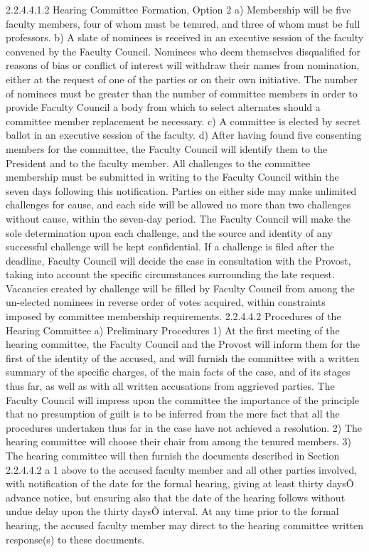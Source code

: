 \documentclass[letterpaper, 11pt]{article}
\begin{document}
				2.2.4.4.1.2 Hearing Committee Formation, Option 2
				a) Membership will be five faculty members, four of whom must be tenured, and three of whom must be full professors.
				b) A slate of nominees is received in an executive session of the faculty convened by the Faculty Council.  Nominees who deem themselves disqualified for reasons of bias or conflict of interest will withdraw their names from nomination, either at the request of one of the parties or on their own initiative.  The number of nominees must be greater than the number of committee members in order to provide Faculty Council a body from which to select alternates should a committee member replacement be necessary.
				c) A committee is elected by secret ballot in an executive session of the faculty.
				d) After having found five consenting members for the committee, the Faculty Council will identify them to the President and to the faculty member.  All challenges to the committee membership must be submitted in writing to the Faculty Council within the seven days following this notification.  Parties on either side may make unlimited challenges for cause, and each side will be allowed no more than two challenges without cause, within the seven-day period.  The Faculty Council will make the sole determination upon each challenge, and the source and identity of any successful challenge will be kept confidential.  If a challenge is filed after the deadline, Faculty Council will decide the case in consultation with the Provost, taking into account the specific circumstances surrounding the late request.  Vacancies created by challenge will be filled by Faculty Council from among the un-elected nominees in reverse order of votes acquired, within constraints imposed by committee membership requirements.
				2.2.4.4.2 Procedures of the Hearing Committee
				a) Preliminary Procedures
				1) At the first meeting of the hearing committee, the Faculty Council and the Provost will inform them for the first of the identity of the accused, and will furnish the committee with a written summary of the specific charges, of the main facts of the case, and of its stages thus far, as well as with all written accusations from aggrieved parties. The Faculty Council will impress upon the committee the importance of the principle that no presumption of guilt is to be inferred from the mere fact that all the procedures undertaken thus far in the case have not achieved a resolution.
				2) The hearing committee will choose their chair from among the tenured members.
				3) The hearing committee will then furnish the documents described in Section 2.2.4.4.2 a 1 above to the accused faculty member and all other parties involved, with notification of the date for the formal hearing, giving at least thirty daysÕ advance notice, but ensuring also that the date of the hearing follows without undue delay upon the thirty daysÕ interval.  At any time prior to the formal hearing, the accused faculty member may direct to the hearing committee written response(s) to these documents.
\end{document}
